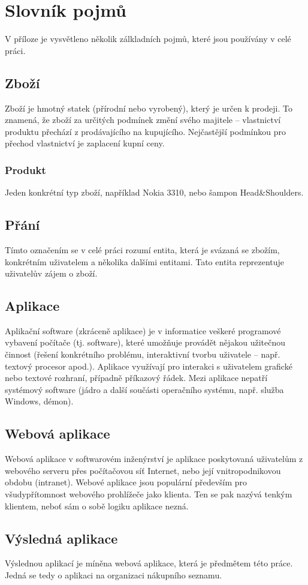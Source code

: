 \chapter{Slovník pojmů}
V příloze je vysvětleno několik zálkladních pojmů, které jsou používány v celé práci.
\section{Zboží}
Zboží je hmotný statek (přírodní nebo vyrobený), který je určen k prodeji. To znamená, že zboží za určitých podmínek změní svého majitele – vlastnictví produktu přechází z prodávajícího na kupujícího. Nejčastější podmínkou pro přechod vlastnictví je zaplacení kupní ceny.
\subsection{Produkt}
Jeden konkrétní typ zboží, například Nokia 3310, nebo šampon Head&Shoulders.
\section{Přání}
Tímto označením se v celé práci rozumí entita, která je svázaná se zbožím, konkrétním uživatelem a několika dalšími entitami. Tato entita reprezentuje uživatelův zájem o zboží.

\section{Aplikace}
Aplikační software (zkráceně aplikace) je v informatice veškeré programové vybavení počítače (tj. software), které umožňuje provádět nějakou užitečnou činnost (řešení konkrétního problému, interaktivní tvorbu uživatele – např. textový procesor apod.). Aplikace využívají pro interakci s uživatelem grafické nebo textové rozhraní, případně příkazový řádek. Mezi aplikace nepatří systémový software (jádro a další součásti operačního systému, např. služba Windows, démon).

\section{Webová aplikace}
Webová aplikace v softwarovém inženýrství je aplikace poskytovaná uživatelům z webového serveru přes počítačovou síť Internet, nebo její vnitropodnikovou obdobu (intranet). Webové aplikace jsou populární především pro všudypřítomnost webového prohlížeče jako klienta. Ten se pak nazývá tenkým klientem, neboť sám o sobě logiku aplikace nezná.

\section{Výsledná aplikace}
Výslednou aplikací je míněna webová aplikace, která je předmětem této práce. Jedná se tedy o aplikaci na organizaci nákupního seznamu.
